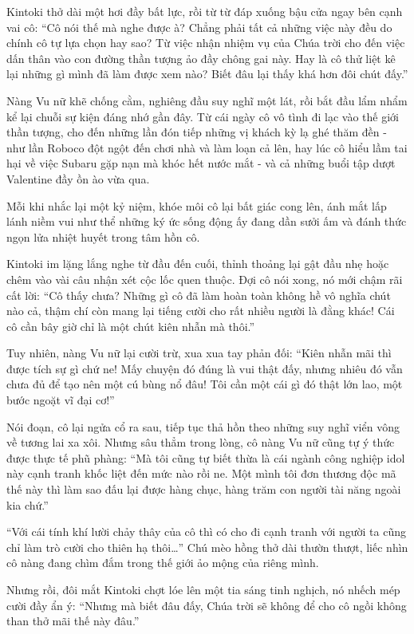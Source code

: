 \documentclass[../main.tex]{subfiles}
\begin{document}
Kintoki thở dài một hơi đầy bất lực, rồi từ từ đáp xuống bậu cửa ngay bên cạnh vai cô: ``Cô nói thế mà nghe được à? Chẳng phải tất cả những việc này đều do chính cô tự lựa chọn hay sao? Từ việc nhận nhiệm vụ của Chúa trời cho đến việc dấn thân vào con đường thần tượng ảo đầy chông gai này. Hay là cô thử liệt kê lại những gì mình đã làm được xem nào? Biết đâu lại thấy khá hơn đôi chút đấy.''

Nàng Vu nữ khẽ chống cằm, nghiêng đầu suy nghĩ một lát, rồi bắt đầu lẩm nhẩm kể lại chuỗi sự kiện đáng nhớ gần đây. Từ cái ngày cô vô tình đi lạc vào thế giới thần tượng, cho đến những lần đón tiếp những vị khách kỳ lạ ghé thăm đền - như lần Roboco đột ngột đến chơi nhà và làm loạn cả lên, hay lúc cô hiểu lầm tai hại về việc Subaru gặp nạn mà khóc hết nước mắt - và cả những buổi tập dượt Valentine đầy ồn ào vừa qua.

Mỗi khi nhắc lại một kỷ niệm, khóe môi cô lại bất giác cong lên, ánh mắt lấp lánh niềm vui như thể những ký ức sống động ấy đang dần sưởi ấm và đánh thức ngọn lửa nhiệt huyết trong tâm hồn cô.

Kintoki im lặng lắng nghe từ đầu đến cuối, thỉnh thoảng lại gật đầu nhẹ hoặc chêm vào vài câu nhận xét cộc lốc quen thuộc. Đợi cô nói xong, nó mới chậm rãi cất lời: ``Cô thấy chưa? Những gì cô đã làm hoàn toàn không hề vô nghĩa chút nào cả, thậm chí còn mang lại tiếng cười cho rất nhiều người là đằng khác! Cái cô cần bây giờ chỉ là một chút kiên nhẫn mà thôi.''

Tuy nhiên, nàng Vu nữ lại cười trừ, xua xua tay phản đối: ``Kiên nhẫn mãi thì được tích sự gì chứ ne! Mấy chuyện đó đúng là vui thật đấy, nhưng nhiêu đó vẫn chưa đủ để tạo nên một cú bùng nổ đâu! Tôi cần một cái gì đó thật lớn lao, một bước ngoặt vĩ đại cơ!''

Nói đoạn, cô lại ngửa cổ ra sau, tiếp tục thả hồn theo những suy nghĩ viển vông về tương lai xa xôi. Nhưng sâu thẳm trong lòng, cô nàng Vu nữ cũng tự ý thức được thực tế phũ phàng: ``Mà tôi cũng tự biết thừa là cái ngành công nghiệp idol này cạnh tranh khốc liệt đến mức nào rồi ne. Một mình tôi đơn thương độc mã thế này thì làm sao đấu lại được hàng chục, hàng trăm con người tài năng ngoài kia chứ.''

``Với cái tính khí lười chảy thây của cô thì có cho đi cạnh tranh với người ta cũng chỉ làm trò cười cho thiên hạ thôi\dots'' Chú mèo hồng thở dài thườn thượt, liếc nhìn cô nàng đang chìm đắm trong thế giới ảo mộng của riêng mình.

Nhưng rồi, đôi mắt Kintoki chợt lóe lên một tia sáng tinh nghịch, nó nhếch mép cười đầy ẩn ý: ``Nhưng mà biết đâu đấy, Chúa trời sẽ không để cho cô ngồi không than thở mãi thế này đâu.''
\end{document}

